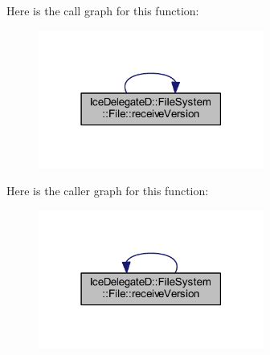 Here is the call graph for this function\+:
\nopagebreak
\begin{figure}[H]
\begin{center}
\leavevmode
\includegraphics[width=210pt]{class_ice_delegate_d_1_1_file_system_1_1_file_ac1937c3e49ac89a8794073205558edea_cgraph}
\end{center}
\end{figure}




Here is the caller graph for this function\+:
\nopagebreak
\begin{figure}[H]
\begin{center}
\leavevmode
\includegraphics[width=210pt]{class_ice_delegate_d_1_1_file_system_1_1_file_ac1937c3e49ac89a8794073205558edea_icgraph}
\end{center}
\end{figure}


\hypertarget{class_ice_delegate_d_1_1_file_system_1_1_file_a219881647e8715fbf6e0f76d172b72b1}{}
